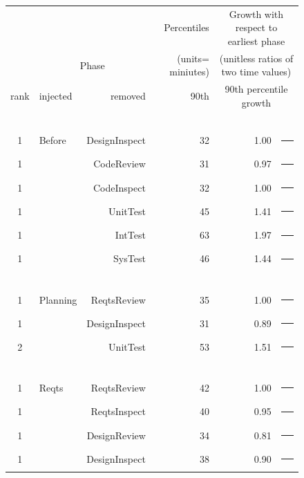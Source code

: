 \documentclass[smallcondensed]{svjour3}
\def\baselinestretch{1}
\begin{document}
 \begin{figure}[!t]
\begin{center}
\scriptsize
\begin{tabular}{c|lr|r|rl}
  & \multicolumn{2}{c|}{ } &  Percentiles & \multicolumn{2}{c}{Growth with respect to earliest phase  } \\ 
   & \multicolumn{2}{c|}{Phase} &  (units= miniutes) & \multicolumn{2}{c}{(unitless ratios of two time values) } \\\hline


  rank & injected & removed &   90th   &  \multicolumn{2}{c}{90th percentile growth} \\ 
\hline\multicolumn{6}{c}{~}  \\
1 &  Before   &   DesignInspect     & 32  &  1.00 & \textcolor{black}{\rule{10mm}{2mm}}\\
1 &   &   CodeReview      &   31   &    0.97 & \textcolor{black}{\rule{9mm}{2mm}}\\
1 &   &   CodeInspect     &   32   &    1.00 & \textcolor{black}{\rule{10mm}{2mm}}\\
1 &   &   UnitTest        &   45  &    1.41 & \textcolor{black}{\rule{14mm}{2mm}}\\
1 &   &   IntTest         &   63  &   1.97 & \textcolor{black}{\rule{19mm}{2mm}}\\
1 &   &   SysTest         &   46   &   1.44 & \textcolor{black}{\rule{14mm}{2mm}}\\  
\hline\multicolumn{6}{c}{~}  \\
1 &  Planning     &   ReqtsReview       & 35   &   1.00 & \textcolor{black}{\rule{10mm}{2mm}}\\
1 &               &   DesignInspect     & 31  &   0.89 & \textcolor{black}{\rule{8mm}{2mm}}\\
2 &               &   UnitTest          & 53 &   1.51 & \textcolor{black}{\rule{15mm}{2mm}}\\
\hline\multicolumn{6}{c}{~}  \\
1 &  Reqts   &   ReqtsReview      & 42 &    1.00 & \textcolor{black}{\rule{10mm}{2mm}}\\
1 &          &   ReqtsInspect      & 40 &     0.95 & \textcolor{black}{\rule{9mm}{2mm}}\\
1 &          &   DesignReview      & 34 &    0.81 & \textcolor{black}{\rule{8mm}{2mm}}\\
1 &          &   DesignInspect     & 38 &     0.90 & \textcolor{black}{\rule{9mm}{2mm}}\\

\end{tabular}
\end{center}
\end{figure}
\end{document}
